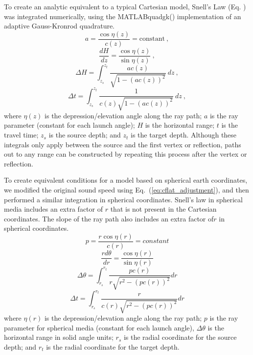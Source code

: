 \documentclass{ws-jca}
\begin{document}
To create an analytic equivalent to a typical Cartesian model, Snell's Law
(Eq. \label{eq:snells_cart}) was integrated numerically, using the
MATLAB\texttrademark quadgk() implementation of an adaptive Gauss-Kronrod
quadrature.\cite{Shampine2010}
\begin{equation}
	a = \frac{\cos{\eta(z)}}{c(z)} = \text{constant} \:,
	\label{eq:snells_cart}
\end{equation}
\begin{equation}
	\frac{dH}{dz} =  \frac{\cos{\eta(z)}}{\sin{\eta(z)}} \:,
	\label{eq:snells_cart_slope}
\end{equation}
\begin{equation}
	\Delta H = \int_{z_s}^{z_t} \frac{ a c(z) }{ \sqrt{ 1-(a c(z))^2 } } \: dz \:,
	\label{eq:snells_cart_integ}
\end{equation}
\begin{equation}
	\Delta t = \int_{z_s}^{z_t} \frac{1}{ c(z) \sqrt{ 1-(a c(z))^2 } } \: dz \:,
	\label{eq:snells_cart_time_integ}
\end{equation}
where
\(\eta(z)\) is the depression/elevation angle along the ray path;
$a$ is the ray parameter (constant for each launch angle);
\(H\) is the horizontal range;
\(t\) is the travel time;
\(z_s\) is the source depth; and
\(z_t\) is the target depth.
Although these integrals only apply between the source and the first vertex
or reflection, paths out to any range can be constructed by repeating this
process after the vertex or reflection.

To create equivalent conditions for a model based on spherical earth
coordinates, we modified the original sound speed using
Eq.~(\ref{eq:cflat_adjustment}), and then performed a similar integration
in spherical coordinates. Snell's law in spherical media includes an extra
factor of $r$ that is not present in the Cartesian
coordinates.\cite{Cerveny2001} The slope of the ray path also includes an
extra factor of$r$ in spherical coordinates.
\begin{equation}
	p = \frac{r \cos{\eta(r)}}{c(r)} = constant
	\label{eq:snells_sphr}
\end{equation}
\begin{equation}
	\frac{r d\theta}{dr} = \frac{\cos{\eta(r)}}{\sin{\eta(r)}}
	\label{eq:snells_sphr_slope}
\end{equation}
\begin{equation}
	\Delta \theta = \int_{r_s}^{r_t} \frac{ p c(r) }{ r \sqrt{ r^2-(p c(r))^2 } } dr
	\label{eq:snells_sphr_integ}
\end{equation}
\begin{equation}
	\Delta t = \int_{r_s}^{r_t} \frac{ r }{ c(r) \sqrt{ r^2-(p c(r))^2 } } dr
	\label{eq:snells_sphr_time_integ}
\end{equation}
where
\(\eta(r)\) is the depression/elevation angle along the ray path;
$p$ is the ray parameter for spherical media (constant for each launch angle),
\(\Delta \theta \) is the horizontal range in solid angle units;
\(r_s\) is the radial coordinate for the source depth; and
\(r_t\) is the radial coordinate for the target depth.
\end{document}
